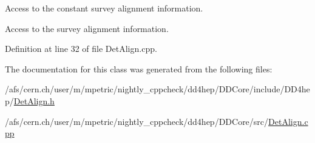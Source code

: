 Access to the constant survey alignment information. 

Access to the survey alignment information. 

Definition at line 32 of file Det\+Align.\+cpp.



The documentation for this class was generated from the following files\+:\begin{DoxyCompactItemize}
\item 
/afs/cern.\+ch/user/m/mpetric/nightly\+\_\+cppcheck/dd4hep/\+D\+D\+Core/include/\+D\+D4hep/\hyperlink{_det_align_8h}{Det\+Align.\+h}\item 
/afs/cern.\+ch/user/m/mpetric/nightly\+\_\+cppcheck/dd4hep/\+D\+D\+Core/src/\hyperlink{_det_align_8cpp}{Det\+Align.\+cpp}\end{DoxyCompactItemize}
